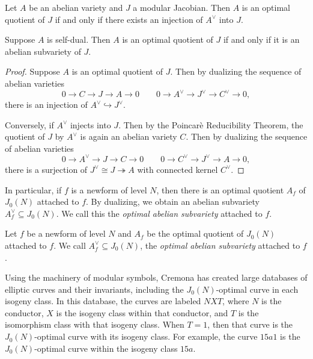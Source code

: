 \begin{proposition}
    \label{prop:optimal}
    Let $A$ be an abelian variety and $J$ a modular Jacobian. Then $A$ is an
    optimal quotient of $J$ if and only if there exists an injection of
    $A^\vee$ into $J$.

    Suppose $A$ is self-dual. Then
    $A$ is an optimal quotient of $J$ if and only if it is an abelian
    subvariety of $J$.
\end{proposition}
\begin{proof}
    Suppose $A$ is an optimal quotient of $J$. Then by dualizing the sequence
    of abelian varieties~\cite[Proposition 2.4.2]{lange-birkenhake:complex}
    \[
        0 \to C \to J \to A \to 0 \qquad
        0\to A^\vee \to J^\vee \to C^\vee \to 0,
    \]
    there is an injection of $A^\vee\hookrightarrow J^\vee$.

    Conversely, if $A^\vee$ injects into $J$. Then by the Poincar\`{e} Reducibility
    Theorem, the quotient of $J$ by $A^\vee$ is again an abelian variety $C$.
    Then by dualizing the sequence of abelian varieties
    \[
        0 \to A^\vee \to J \to C \to 0 \qquad
        0 \to C^\vee \to J^\vee \to A \to 0,
    \]
    there is a surjection of $J^\vee\cong J\twoheadrightarrow A$ with connected
    kernel $C^\vee$.
\end{proof}

In particular, if $f$ is a newform of level $N$, then there is an optimal
quotient $A_f$ of $J_0(N)$ attached to $f$. By dualizing, we obtain an abelian
subvariety $A_f ^\vee\subseteq J_0(N)$. We call this the \emph{optimal abelian
subvariety} attached to $f$.
\begin{definition}
    \label{defn:optimal_subvariety}
    Let $f$ be a newform of level $N$ and $A_f$ be the optimal quotient of
    $J_0(N)$ attached to $f$. We call $A_f^\vee\subseteq J_0(N)$, the
    \emph{optimal abelian subvariety} attached to $f$.
\end{definition}

Using the machinery of modular symbols, Cremona has created large databases of
elliptic curves and their invariants, including the $J_0(N)$-optimal curve in
each isogeny class. In this database, the curves are labeled $NXT$, where $N$
is the conductor, $X$ is the isogeny class within that conductor, and $T$ is
the isomorphism class with that isogeny class. When $T=1$, then that curve is
the $J_0(N)$-optimal curve with its isogeny class. For example, the curve
$15a1$ is the $J_0(N)$-optimal curve within the isogeny class $15a$.

